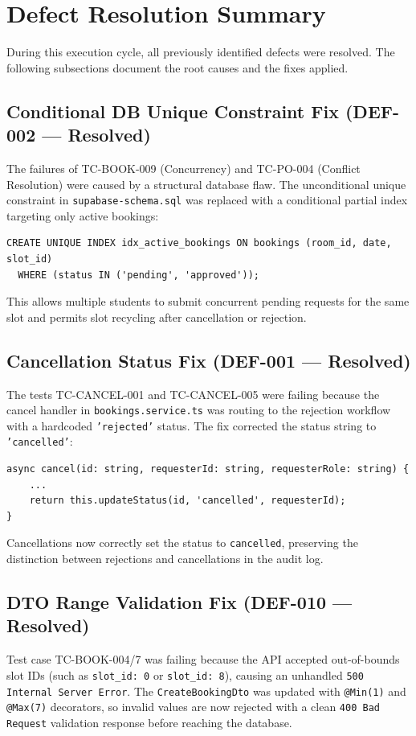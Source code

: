 \documentclass[11pt,a4paper]{article}
\begin{document}
\newpage
\section{Defect Resolution Summary} \label{sec:failures}
During this execution cycle, all previously identified defects were resolved. The following subsections document the root causes and the fixes applied.

\subsection{Conditional DB Unique Constraint Fix (DEF-002 --- Resolved)}
The failures of TC-BOOK-009 (Concurrency) and TC-PO-004 (Conflict Resolution) were caused by a structural database flaw. The unconditional unique constraint in \texttt{supabase-schema.sql} was replaced with a conditional partial index targeting only active bookings:
\begin{verbatim}
CREATE UNIQUE INDEX idx_active_bookings ON bookings (room_id, date, slot_id)
  WHERE (status IN ('pending', 'approved'));
\end{verbatim}
This allows multiple students to submit concurrent pending requests for the same slot and permits slot recycling after cancellation or rejection.

\subsection{Cancellation Status Fix (DEF-001 --- Resolved)}
The tests TC-CANCEL-001 and TC-CANCEL-005 were failing because the cancel handler in \texttt{bookings.service.ts} was routing to the rejection workflow with a hardcoded \texttt{'rejected'} status. The fix corrected the status string to \texttt{'cancelled'}:
\begin{verbatim}
async cancel(id: string, requesterId: string, requesterRole: string) {
    ...
    return this.updateStatus(id, 'cancelled', requesterId);
}
\end{verbatim}
Cancellations now correctly set the status to \texttt{cancelled}, preserving the distinction between rejections and cancellations in the audit log.

\subsection{DTO Range Validation Fix (DEF-010 --- Resolved)}
Test case TC-BOOK-004/7 was failing because the API accepted out-of-bounds slot IDs (such as \texttt{slot\_id: 0} or \texttt{slot\_id: 8}), causing an unhandled \texttt{500 Internal Server Error}. The \texttt{CreateBookingDto} was updated with \texttt{@Min(1)} and \texttt{@Max(7)} decorators, so invalid values are now rejected with a clean \texttt{400 Bad Request} validation response before reaching the database.
\end{document}
